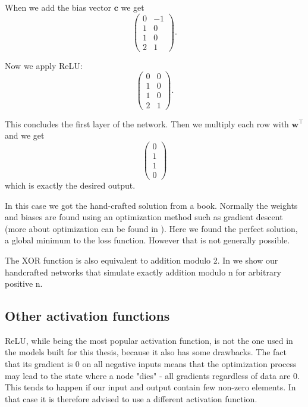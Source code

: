 When we add the bias vector $\textbf{c}$ we get 
$$
\left(\begin{matrix}
	0 & -1\\
	1 & 0\\
	1 & 0\\
	2 & 1
\end{matrix}\right).$$

Now we apply ReLU:
$$
\left(\begin{matrix}
	0 & 0\\
	1 & 0\\
	1 & 0\\
	2 & 1
\end{matrix}\right).$$

This concludes the first layer of the network. Then we multiply each row with $\textbf{w}^\top$ and we get
$$	
\left(\begin{matrix}
	0\\
	1\\
	1\\
	0
\end{matrix}\right)$$
which is exactly the desired output.

In this case we got the hand-crafted solution from a book. Normally the weights and biases are found using an optimization method such as gradient descent (more about optimization can be found in ). Here we found the perfect solution, a global minimum to the loss function. However that is not generally possible.

The XOR function is also equivalent to addition modulo 2. In  we show our handcrafted networks that simulate exactly addition modulo n for arbitrary positive n.

\subsection{Other activation functions}
\label{section:activation_functions}
ReLU, while being the most popular activation function, is not the one used in the models built for this thesis, because it also has some drawbacks. The fact that its gradient is $0$ on all negative inputs means that the optimization process may lead to the state where a node "dies" - all gradients regardless of data are 0. This tends to happen if our input and output contain few non-zero elements. In that case it is therefore advised to use a different activation function.

